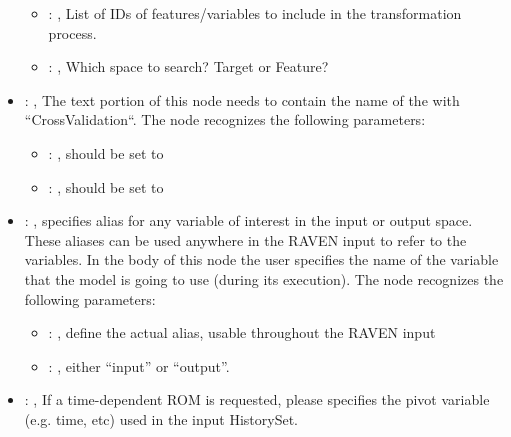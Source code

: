 \begin{itemize}
\begin{itemize}
        \item {}: , 
          List of IDs of features/variables to include in the transformation process.

        \item {}: , 
          Which space to search? Target or Feature?
      \end{itemize}

    \item {}: , 
      The text portion of this node needs to contain the name of the  with
               ``CrossValidation``.
      The  node recognizes the following parameters:
        \begin{itemize}
          \item {}: , 
            should be set to 
          \item {}: , 
            should be set to 
      \end{itemize}

    \item {}: , 
      specifies alias for         any variable of interest in the input or output space. These
      aliases can be used anywhere in the RAVEN input to         refer to the variables. In the body
      of this node the user specifies the name of the variable that the model is going to use
      (during its execution).
      The  node recognizes the following parameters:
        \begin{itemize}
          \item {}: , 
            define the actual alias, usable throughout the RAVEN input
          \item {}: , 
            either ``input'' or ``output''.
      \end{itemize}

    \item {}: , 
      If a time-dependent ROM is requested, please specifies the pivot         variable (e.g. time,
      etc) used in the input HistorySet.


\end{itemize}
